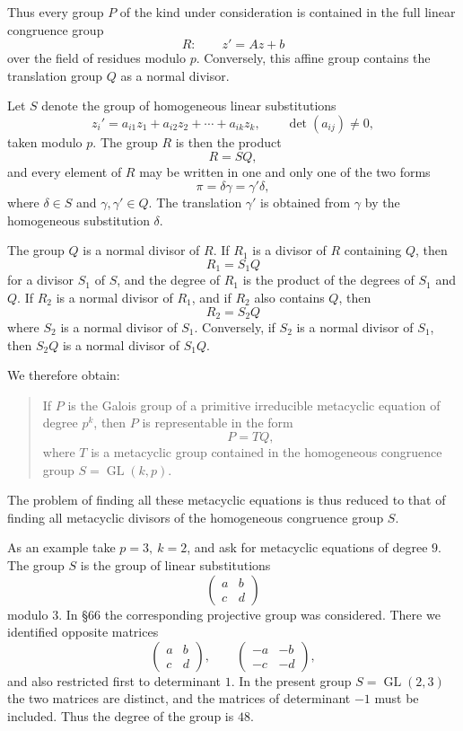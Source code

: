 \documentclass[11pt,a4paper]{book}
\DeclareMathOperator{\GL}{GL}
\begin{document}
Thus every group \(P\) of the kind under consideration is contained in the full linear congruence group
\[
 R:\qquad
 z'=Az+b
\]
over the field of residues modulo \(p\).  Conversely, this affine group contains the translation group \(Q\) as a normal divisor.

Let \(S\) denote the group of homogeneous linear substitutions
\[
 z_i'=a_{i1}z_1+a_{i2}z_2+\cdots+a_{ik}z_k,\qquad
 \det(a_{ij})\ne0,
\]
taken modulo \(p\).  The group \(R\) is then the product
\[
 R=SQ,
\]
and every element of \(R\) may be written in one and only one of the two forms
\[
 \pi=\delta\gamma=\gamma'\delta,
\]
where \(\delta\in S\) and \(\gamma,\gamma'\in Q\).  The translation \(\gamma'\) is obtained from \(\gamma\) by the homogeneous substitution \(\delta\).

The group \(Q\) is a normal divisor of \(R\).  If \(R_1\) is a divisor of \(R\) containing \(Q\), then
\[
 R_1=S_1Q
\]
for a divisor \(S_1\) of \(S\), and the degree of \(R_1\) is the product of the degrees of \(S_1\) and \(Q\).  If \(R_2\) is a normal divisor of \(R_1\), and if \(R_2\) also contains \(Q\), then
\[
 R_2=S_2Q
\]
where \(S_2\) is a normal divisor of \(S_1\).  Conversely, if \(S_2\) is a normal divisor of \(S_1\), then \(S_2Q\) is a normal divisor of \(S_1Q\).

We therefore obtain:

\begin{quote}
If \(P\) is the Galois group of a primitive irreducible metacyclic equation of degree \(p^k\), then \(P\) is representable in the form
\[
 P=TQ,
\]
where \(T\) is a metacyclic group contained in the homogeneous congruence group \(S=\GL(k,p)\).
\end{quote}

The problem of finding all these metacyclic equations is thus reduced to that of finding all metacyclic divisors of the homogeneous congruence group \(S\).

As an example take \(p=3,\ k=2\), and ask for metacyclic equations of degree \(9\).  The group \(S\) is the group of linear substitutions
\[
 \begin{pmatrix}a&b\\ c&d\end{pmatrix}
\]
modulo \(3\).  In \S 66 the corresponding projective group was considered.  There we identified opposite matrices
\[
 \begin{pmatrix}a&b\\ c&d\end{pmatrix},
 \qquad
 \begin{pmatrix}-a&-b\\ -c&-d\end{pmatrix},
\]
and also restricted first to determinant \(1\).  In the present group \(S=\GL(2,3)\) the two matrices are distinct, and the matrices of determinant \(-1\) must be included.  Thus the degree of the group is \(48\).
\end{document}
